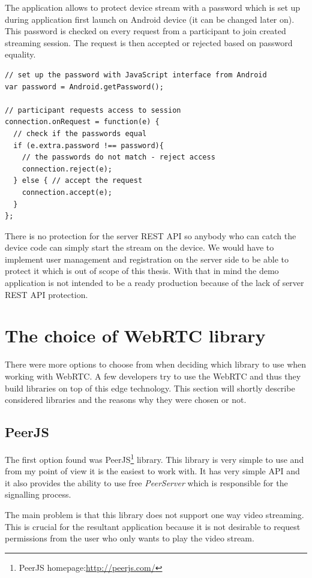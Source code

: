 The application allows to protect device stream with a password which is set up during application first launch on Android device (it can be changed later on). This password is checked on every request from a participant to join created streaming session. The request is then accepted or rejected based on password equality.

\begin{lstlisting}
// set up the password with JavaScript interface from Android
var password = Android.getPassword();

// participant requests access to session
connection.onRequest = function(e) {
  // check if the passwords equal
  if (e.extra.password !== password){
    // the passwords do not match - reject access
    connection.reject(e);
  } else { // accept the request
    connection.accept(e);
  }
};
\end{lstlisting}


There is no protection for the server REST API so anybody who can catch the device code can simply start the stream on the device. We would have to implement user management and registration on the server side to be able to protect it which is out of scope of this thesis. With that in mind the demo application is not intended to be a ready production because of the lack of server REST API protection.

\section{The choice of WebRTC library}
There were more options to choose from when deciding which library to use when working with WebRTC. A few developers try to use the WebRTC and thus they build libraries on top of this edge technology. This section will shortly describe considered libraries and the reasons why they were chosen or not.

\subsection{PeerJS}
The first option found was PeerJS\footnote{PeerJS homepage:\url{http://peerjs.com/}} library. This library is very simple to use and from my point of view it is the easiest to work with. It has very simple API and it also provides the ability to use free \textit{PeerServer} which is responsible for the signalling process.

The main problem is that this library does not support one way video streaming. This is crucial for the resultant application because it is not desirable to request permissions from the user who only wants to play the video stream.

